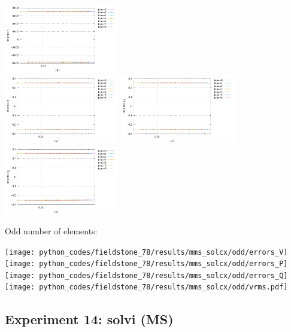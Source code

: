 \begin{center}
\includegraphics[width=5cm]{python_codes/fieldstone_78/results/stats_v_exp13.pdf}\\
\includegraphics[width=5cm]{python_codes/fieldstone_78/results/stats_p_exp13.pdf}
\includegraphics[width=5cm]{python_codes/fieldstone_78/results/stats_q1_exp13.pdf}
\includegraphics[width=5cm]{python_codes/fieldstone_78/results/stats_q2_exp13.pdf}
\end{center}

Odd number of elements:

\begin{center}
\texttt{[image: python\_codes/fieldstone\_78/results/mms\_solcx/odd/errors\_V]}
\texttt{[image: python\_codes/fieldstone\_78/results/mms\_solcx/odd/errors\_P]}\\
\texttt{[image: python\_codes/fieldstone\_78/results/mms\_solcx/odd/errors\_Q]}
\texttt{[image: python\_codes/fieldstone\_78/results/mms\_solcx/odd/vrms.pdf]}
\end{center}



\newpage
\subsection*{Experiment 14: solvi (MS)}

